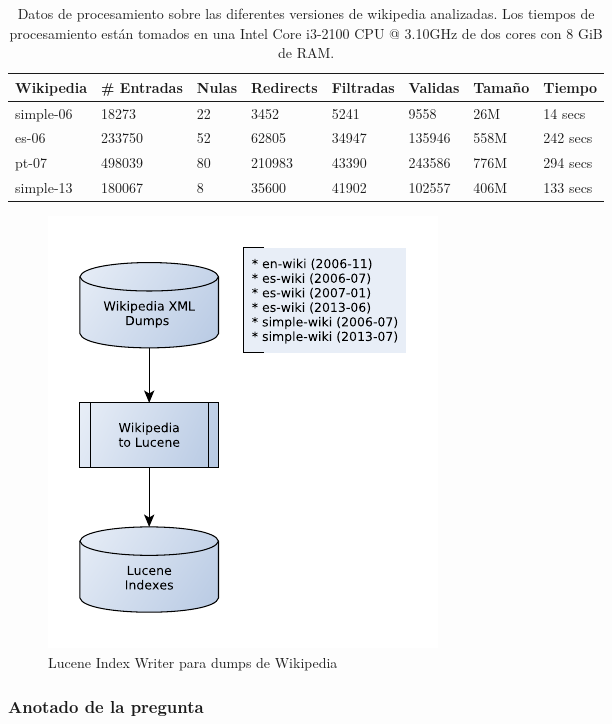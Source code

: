 \begin{table}
\centering
\begin{center}
\begin{tabular}{| l | l | l | l | l | l| l|l|}
\hline
Wikipedia & \# Entradas & Nulas & Redirects & Filtradas & Validas & Tamaño & Tiempo \\ \hline
simple-06 & 18273 & 22 &  3452 & 5241 & 9558 & 26M & 14 secs \\ \hline
es-06 & 233750 & 52 & 62805 & 34947 & 135946 & 558M & 242 secs\\ \hline
pt-07 & 498039 & 80 & 210983 & 43390 & 243586 & 776M & 294 secs\\ \hline
simple-13 & 180067 & 8 & 35600 & 41902 & 102557 & 406M & 133 secs\\ \hline
\end{tabular}
\caption{Datos de procesamiento sobre las diferentes versiones de wikipedia analizadas. Los tiempos de procesamiento están tomados en una Intel Core i3-2100 CPU @ 3.10GHz de dos cores con 8 GiB de RAM.}
\label{table:creacion-indices}
\end{center}
\end{table}


\begin{figure}[H]
  \centering
    \includegraphics{graficos/LuceneIndexWriterWiki}
  \caption{Lucene Index Writer para dumps de Wikipedia}
  \label{fig:LuceneIndexWriterWiki}
\end{figure}


\subsubsection{Anotado de la pregunta}

